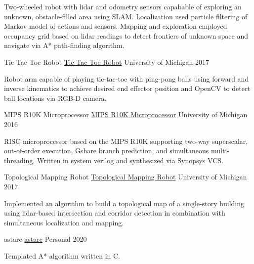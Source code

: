 \documentclass[11pt, a4paper]{cv}
\begin{document}
\begin{cv}
\begin{projects}
\begin{cventries}
{\begin{cvparagraph}
Two-wheeled robot with lidar and odometry sensors capabable of exploring an unknown, obstacle-filled area using SLAM. Localization used particle filtering of Markov model of actions and sensors. Mapping and exploration employed occupancy grid based on lidar readings to detect frontiers of unknown space and navigate via A* path-finding algorithm.
\end{cvparagraph}}
\cventrycompact
{
{Tic-Tac-Toe Robot}
{\color{hrefblue}\href{https://drive.google.com/drive/folders/102AN8otUolVnhyJ00cVi4qK0T-imfvds}{Tic-Tac-Toe Robot}}}
{}
{University of Michigan}
{2017}
{\begin{cvparagraph}
Robot arm capable of playing tic-tac-toe with ping-pong balls using forward and inverse kinematics to achieve desired end effector position and OpenCV to detect ball locations via RGB-D camera.
\end{cvparagraph}}
\cventrycompact
{
{MIPS R10K Microprocessor}
{\color{hrefblue}\href{https://drive.google.com/drive/folders/1Zar\_EmEbRwZw6HVLnNumsjWDx8cLE\_pI}{MIPS R10K Microprocessor}}}
{}
{University of Michigan}
{2016}
{\begin{cvparagraph}
RISC microprocessor based on the MIPS R10K supporting two-way superscalar, out-of-order execution, Gshare branch prediction, and simultaneous multi-threading. Written in system verilog and synthesized via Synopsys VCS.
\end{cvparagraph}}
\cventrycompact
{
{Topological Mapping Robot}
{\color{hrefblue}\href{https://drive.google.com/drive/folders/1HPq7hU05i7k-j3WwfQ18W5DzQ3FlkSZ9}{Topological Mapping Robot}}}
{}
{University of Michigan}
{2017}
{\begin{cvparagraph}
Implemented an algorithm to build a topological map of a single-story building using lidar-based intersection and corridor detection in combination with simultaneous localization and mapping.
\end{cvparagraph}}
\cventrycompact
{
{astarc}
{\color{hrefblue}\href{https://github.com/brandonmosher/astarc}{astarc}}}
{}
{Personal}
{2020}
{\begin{cvparagraph}
Templated A* algorithm written in C.
\end{cvparagraph}}
\cventrycompact
{
}
\end{cventries}
\end{projects}
\end{cv}
\end{document}
